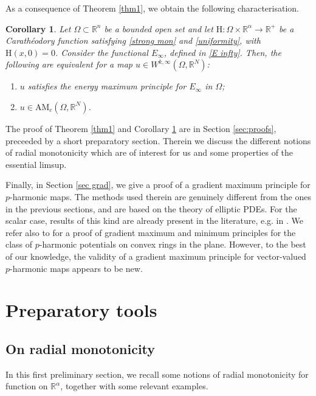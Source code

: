 \documentclass[a4paper,11pt]{article}
\numberwithin{equation}{section}
\newtheorem{Corollary}[Theorem]{Corollary}
\newcommand{\numberset}{\mathbb}
\newcommand{\Om}{\Omega}
\newcommand{\R}{\numberset{R}}
\newcommand{\rom}{\mathrm}
\theoremstyle{definition}
\begin{document}
As a consequence of Theorem \ref{thm1}, we obtain the following characterisation.
\begin{Corollary}\label{thm2}
Let $\Om\subset\R^n$ be a bounded open set and let $\rom{H}:\Om\times\R^\alpha\to\R^+$ be a Carathéodory function satisfying \eqref{strong mon} and \eqref{uniformity}, with $\rom{H}(x,0)=0$. Consider the functional $E_\infty$, defined in \eqref{E infty}.
Then, the following are equivalent for a map $u\in W^{k,\infty}(\Om,\R^N)$:
\begin{enumerate}
\item[i)] $u$ satisfies the energy maximum principle for $E_\infty$ in $\Om$;
\item[ii)] $u\in \mathrm {AM}_c(\Om,\R^N)$.
\end{enumerate}
\end{Corollary}
The proof of Theorem \ref{thm1} and Corollary \ref{thm2} are in Section \ref{sec:proofs}, preceeded by a short preparatory section. Therein we discuss the different notions of radial monotonicity which are of interest for us and some properties of the essential limsup. 

Finally, in Section \ref{sec grad}, we give a proof of a gradient maximum principle for $p$-harmonic maps. The methods used therein are genuinely different from the ones in the previous sections, and are based on the theory of elliptic PDEs. For the scalar case, results of this kind are already present in the literature, e.g. in \cite[Chapter 9]{GT}. We refer also to \cite[Appendix B]{PZZ} for a proof of gradient maximum and minimum principles for the class of $p$-harmonic potentials on convex rings in the plane. However, to the best of our knowledge, the validity of a gradient maximum principle for vector-valued $p$-harmonic maps appears to be new.

\section{Preparatory tools}\label{prep}
\subsection{On radial monotonicity}\label{radial mon}
In this first preliminary section, we recall some notions of radial monotonicity for function on $\R^\alpha$, together with some relevant examples.
\end{document}
